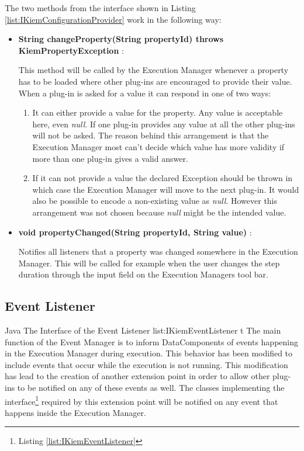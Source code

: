 The two methods from the interface shown in Listing \ref{list:IKiemConfigurationProvider} work
in the following way:

\begin{itemize}
 \item \textbf{String changeProperty(String propertyId) throws KiemPropertyException} :

This method will be called by the Execution Manager whenever a property has to be loaded where
other plug-ins are encouraged to provide their value. When a plug-in is asked for a value it
can respond in one of two ways:
 \begin{enumerate}
  \item It can either provide a value for the property. Any value is acceptable here, even \textit{null}.
If one plug-in provides any value at all the other plug-ins will not be asked. The reason behind this arrangement
is that the Execution Manager most can't decide which value has more validity if more than one
plug-in gives a valid answer.
  \item If it can not provide a value the declared Exception should be thrown in which case the Execution
Manager will move to the next plug-in. It would also be possible to encode a non-existing value as \textit{null}.
However this arrangement was not chosen because \textit{null} might be the intended value.
 \end{enumerate}

 \item \textbf{void propertyChanged(String propertyId, String value)} :

Notifies all listeners that a property was changed somewhere in the Execution Manager. This will be called for example
when the user changes the step duration through the input field on the Execution Managers tool bar.
\end{itemize}

\subsection{Event Listener}
\label{section:EventListener}
\listingjava
{}
{Java}
{The Interface of the Event Listener}
{list:IKiemEventListener}
{t}
The main function of the Event Manager is to inform DataComponents of events
happening in the Execution Manager during execution. This behavior has been modified to include 
events that occur while the execution is not running. This modification has lead to the 
creation of another extension point in order to allow other plug-ins to be notified
on any of these events as well. The classes implementing the interface\footnote{Listing \ref{list:IKiemEventListener}} 
required by this extension point will be notified on any event that happens inside the Execution Manager.

